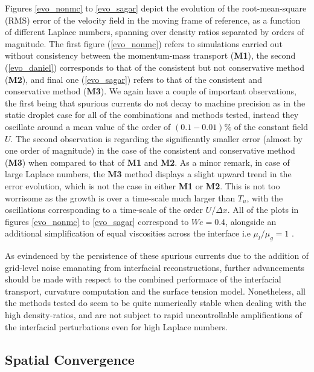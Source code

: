 Figures \ref{evo_nonmc} to \ref{evo_sagar} depict the evolution of the root-mean-square (RMS) error of the velocity field in the moving frame of reference, as a function of different Laplace numbers, spanning over density ratios separated by orders of magnitude. The first figure (\ref{evo_nonmc}) refers to simulations carried out without consistency between the momentum-mass transport (\textbf{M1}), the second (\ref{evo_daniel}) corresponds to that of the consistent but not conservative method (\textbf{M2}), and final one (\ref{evo_sagar}) refers to that of the consistent and conservative method (\textbf{M3}). We again have a couple of important observations, the first being that spurious currents do not decay to machine precision as in the static droplet case for all of the combinations and methods tested, instead they oscillate around a mean value of the order of $(0.1-0.01)\% $ of the constant field $U$. The second observation is regarding the significantly smaller error (almost by one order of magnitude) in the case of the consistent and conservative method (\textbf{M3}) when compared to that of \textbf{M1} and \textbf{M2}. As a minor remark, in case of large Laplace numbers, the \textbf{M3} method displays a slight upward trend in the error evolution, which is not the case in either \textbf{M1} or \textbf{M2}. This is not too worrisome as the growth is over a time-scale much larger than $T_u$, with the oscillations corresponding to a time-scale of the order $U/\Delta x$. All of the plots in figures \ref{evo_nonmc} to \ref{evo_sagar} correspond to $We = 0.4$, alongside an additional simplification of equal viscosities across the interface i.e $\mu_l/\mu_g = 1$ .

As evindenced by the persistence of these spurious currents due to the addition of grid-level noise emanating from interfacial reconstructions, further advancements should be made with respect to the combined performace of the interfacial transport, curvature computation and the surface tension model. Nonetheless, all the methods tested do seem to be quite numerically stable when dealing with the high density-ratios, and are not subject to rapid uncontrollable amplifications of the interfacial perturbations even for high Laplace numbers.

\subsection*{Spatial Convergence}

